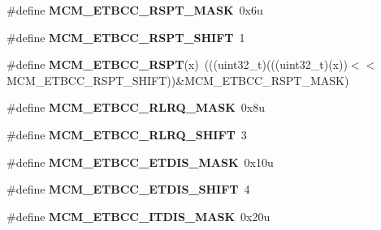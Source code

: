 \begin{DoxyCompactItemize}
\item 
\#define {\bfseries M\+C\+M\+\_\+\+E\+T\+B\+C\+C\+\_\+\+R\+S\+P\+T\+\_\+\+M\+A\+SK}~0x6u\hypertarget{group__MCM__Register__Masks_ga155cfa2bfc46e64c665a8aeed061da6f}{}\label{group__MCM__Register__Masks_ga155cfa2bfc46e64c665a8aeed061da6f}

\item 
\#define {\bfseries M\+C\+M\+\_\+\+E\+T\+B\+C\+C\+\_\+\+R\+S\+P\+T\+\_\+\+S\+H\+I\+FT}~1\hypertarget{group__MCM__Register__Masks_ga7e85c0a405fa8e736ea6b11e2a2ce2cf}{}\label{group__MCM__Register__Masks_ga7e85c0a405fa8e736ea6b11e2a2ce2cf}

\item 
\#define {\bfseries M\+C\+M\+\_\+\+E\+T\+B\+C\+C\+\_\+\+R\+S\+PT}(x)~(((uint32\+\_\+t)(((uint32\+\_\+t)(x))$<$$<$M\+C\+M\+\_\+\+E\+T\+B\+C\+C\+\_\+\+R\+S\+P\+T\+\_\+\+S\+H\+I\+FT))\&M\+C\+M\+\_\+\+E\+T\+B\+C\+C\+\_\+\+R\+S\+P\+T\+\_\+\+M\+A\+SK)\hypertarget{group__MCM__Register__Masks_ga7855e4b02297a6ed3202b7ee2bb536f5}{}\label{group__MCM__Register__Masks_ga7855e4b02297a6ed3202b7ee2bb536f5}

\item 
\#define {\bfseries M\+C\+M\+\_\+\+E\+T\+B\+C\+C\+\_\+\+R\+L\+R\+Q\+\_\+\+M\+A\+SK}~0x8u\hypertarget{group__MCM__Register__Masks_ga16853921aa4b5ded12e5bf4d2c8509fb}{}\label{group__MCM__Register__Masks_ga16853921aa4b5ded12e5bf4d2c8509fb}

\item 
\#define {\bfseries M\+C\+M\+\_\+\+E\+T\+B\+C\+C\+\_\+\+R\+L\+R\+Q\+\_\+\+S\+H\+I\+FT}~3\hypertarget{group__MCM__Register__Masks_ga9ea97398989700f275f186a44b5d86b7}{}\label{group__MCM__Register__Masks_ga9ea97398989700f275f186a44b5d86b7}

\item 
\#define {\bfseries M\+C\+M\+\_\+\+E\+T\+B\+C\+C\+\_\+\+E\+T\+D\+I\+S\+\_\+\+M\+A\+SK}~0x10u\hypertarget{group__MCM__Register__Masks_ga4e65e76bc2ffbd1a4577fb31da7e5fbb}{}\label{group__MCM__Register__Masks_ga4e65e76bc2ffbd1a4577fb31da7e5fbb}

\item 
\#define {\bfseries M\+C\+M\+\_\+\+E\+T\+B\+C\+C\+\_\+\+E\+T\+D\+I\+S\+\_\+\+S\+H\+I\+FT}~4\hypertarget{group__MCM__Register__Masks_ga40fefdc2fb703f686abf76fda0ec6859}{}\label{group__MCM__Register__Masks_ga40fefdc2fb703f686abf76fda0ec6859}

\item 
\#define {\bfseries M\+C\+M\+\_\+\+E\+T\+B\+C\+C\+\_\+\+I\+T\+D\+I\+S\+\_\+\+M\+A\+SK}~0x20u\hypertarget{group__MCM__Register__Masks_ga390a11a02383ea3369843438b3a5ff80}{}\label{group__MCM__Register__Masks_ga390a11a02383ea3369843438b3a5ff80}


\end{DoxyCompactItemize}
